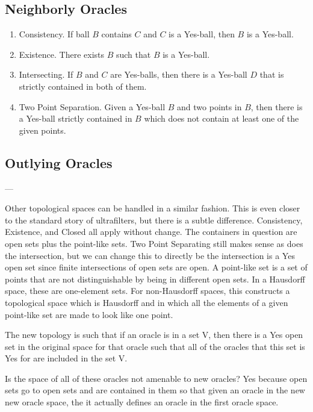 \documentclass[12pt]{article}
\begin{document}
\subsection{Neighborly Oracles}



\begin{enumerate}
    \item Consistency. If ball $B$ contains $C$ and $C$ is a Yes-ball, then $B$ is a Yes-ball.
    \item Existence. There exists $B$ such that $B$ is a Yes-ball.
    \item Intersecting. If $B$ and $C$ are Yes-balls, then there is a Yes-ball $D$ that is strictly contained in both of them. 
    \item Two Point Separation. Given a Yes-ball $B$ and two points in $B$, then there is a Yes-ball strictly contained in $B$ which does not contain at least one of the given points. 
\end{enumerate}

\subsection{Outlying Oracles}

---

Other topological spaces can be handled in a similar fashion. This is even closer to the standard story of ultrafilters, but there is a subtle difference. Consistency, Existence, and Closed all apply without change. The containers in question are open sets plus the point-like sets. Two Point Separating still makes sense as does the intersection, but we can change this to directly be the intersection is a Yes open set since finite intersections of open sets are open.  A point-like set is a set of points that are not distinguishable by being in different open sets. In a Hausdorff space, these are one-element sets. For non-Hausdorff spaces, this constructs a topological space which is Hausdorff and in which all the elements of a given point-like set are made to look like one point. 

The new topology is such that if an oracle is in a set V, then there is a Yes open set in the original space for that oracle such that all of the oracles that this set is Yes for are included in the set V. 

Is the space of all of these oracles not amenable to new oracles? Yes because open sets go to open sets and are contained in them so that given an oracle in the new new oracle space, the it actually defines an oracle in the first oracle space. 
\end{document}
